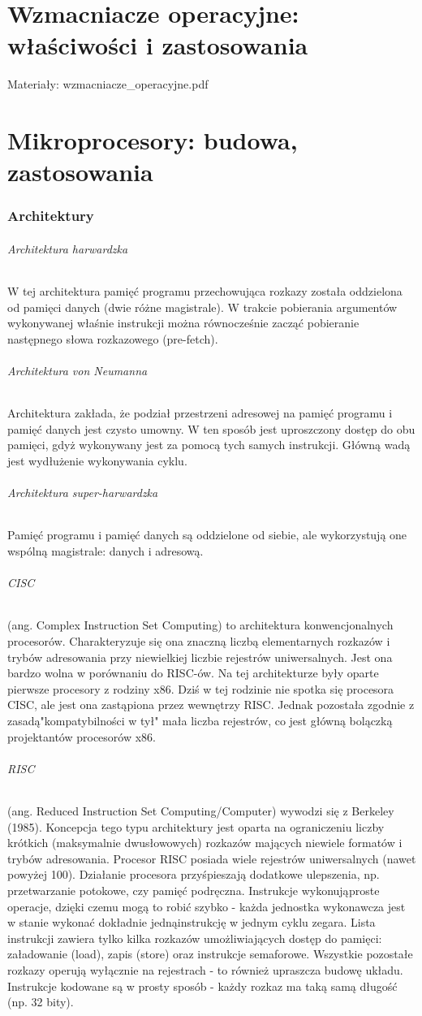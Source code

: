\documentclass[a4paper,twoside]{report}
\begin{document}
\chapter{Wzmacniacze operacyjne: właściwości i zastosowania}
Materiały: wzmacniacze\_operacyjne.pdf

\chapter{Mikroprocesory: budowa, zastosowania}
\subsection{Architektury}
\subparagraph{Architektura harwardzka}
W tej architektura pamięć programu przechowująca rozkazy została oddzielona od pamięci danych (dwie różne magistrale). W trakcie pobierania argumentów wykonywanej właśnie instrukcji można równocześnie zacząć pobieranie następnego słowa rozkazowego (pre-fetch).

\subparagraph{Architektura von Neumanna}
Architektura zakłada, że podział przestrzeni adresowej na pamięć programu i pamięć danych jest czysto umowny. W ten sposób jest uproszczony dostęp do obu pamięci, gdyż wykonywany jest za pomocą tych samych instrukcji. Główną wadą jest wydłużenie wykonywania cyklu.

\subparagraph{Architektura super-harwardzka}
Pamięć programu i pamięć danych są oddzielone od siebie, ale wykorzystują one wspólną magistrale: danych i adresową.

\subparagraph{CISC} (ang. Complex Instruction Set Computing) to architektura konwencjonalnych procesorów. Charakteryzuje się ona znaczną liczbą elementarnych rozkazów i trybów adresowania przy niewielkiej liczbie rejestrów uniwersalnych. Jest ona bardzo wolna w porównaniu do RISC-ów. Na tej architekturze były oparte pierwsze procesory z rodziny x86. Dziś w tej rodzinie nie spotka się procesora CISC, ale jest ona zastąpiona przez wewnętrzy RISC. Jednak pozostała zgodnie z zasadą"kompatybilności w tył" mała liczba rejestrów, co jest główną bolączką projektantów procesorów x86.

\subparagraph{RISC} (ang. Reduced Instruction Set Computing/Computer) wywodzi się z Berkeley (1985). Koncepcja tego typu architektury jest oparta na ograniczeniu liczby krótkich (maksymalnie dwusłowowych) rozkazów mających niewiele formatów i trybów adresowania. Procesor RISC posiada wiele rejestrów uniwersalnych (nawet powyżej 100). Działanie procesora przyśpieszają dodatkowe ulepszenia, np. przetwarzanie potokowe, czy pamięć podręczna. Instrukcje wykonująproste operacje, dzięki czemu mogą to robić szybko - każda jednostka wykonawcza jest w stanie wykonać dokładnie jednąinstrukcję w jednym cyklu zegara. Lista instrukcji zawiera tylko kilka rozkazów umożliwiających dostęp do pamięci: załadowanie (load), zapis (store) oraz instrukcje semaforowe. Wszystkie pozostałe rozkazy operują wyłącznie na rejestrach - to również upraszcza budowę układu. Instrukcje kodowane są w prosty sposób - każdy rozkaz ma taką samą długość (np. 32 bity).
\end{document}
